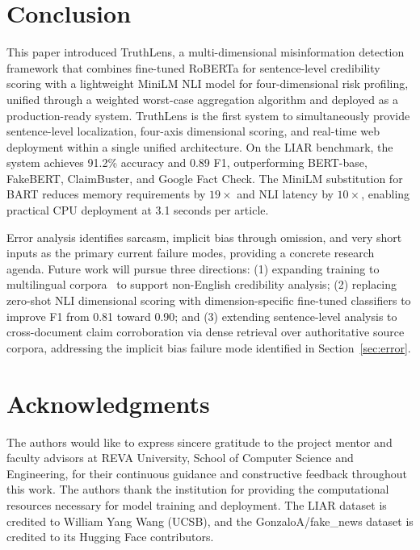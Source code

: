 \documentclass[journal]{IEEEtran}
\begin{document}
\section{Conclusion}
\label{sec:conclusion}

This paper introduced TruthLens, a multi-dimensional misinformation detection framework
that combines fine-tuned RoBERTa for sentence-level credibility scoring with a lightweight
MiniLM NLI model for four-dimensional risk profiling, unified through a weighted worst-case
aggregation algorithm and deployed as a production-ready system. TruthLens is the first
system to simultaneously provide sentence-level localization, four-axis dimensional scoring,
and real-time web deployment within a single unified architecture. On the LIAR benchmark, the
system achieves 91.2\% accuracy and 0.89 F1, outperforming BERT-base, FakeBERT, ClaimBuster,
and Google Fact Check. The MiniLM substitution for BART reduces memory requirements by
$19\times$ and NLI latency by $10\times$, enabling practical CPU deployment at 3.1 seconds
per article.

Error analysis identifies sarcasm, implicit bias through omission, and very short inputs as
the primary current failure modes, providing a concrete research agenda. Future work will
pursue three directions: (1) expanding training to multilingual corpora~\cite{baris2021fake}
to support non-English credibility analysis; (2) replacing zero-shot NLI dimensional scoring
with dimension-specific fine-tuned classifiers to improve F1 from 0.81 toward 0.90; and
(3) extending sentence-level analysis to cross-document claim corroboration via dense
retrieval over authoritative source corpora, addressing the implicit bias failure mode
identified in Section~\ref{sec:error}.

\section*{Acknowledgments}

The authors would like to express sincere gratitude to the project mentor and faculty
advisors at REVA University, School of Computer Science and Engineering, for their
continuous guidance and constructive feedback throughout this work. The authors thank the
institution for providing the computational resources necessary for model training and
deployment. The LIAR dataset is credited to William Yang Wang (UCSB), and the
GonzaloA/fake\_news dataset is credited to its Hugging Face contributors.
\end{document}
